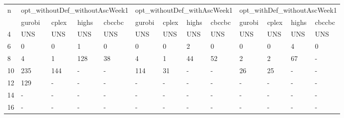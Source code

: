 \documentclass{article}
\begin{document}
\begin{table}[H]
\centering
\begin{tabular}{| p{0.35cm}|p{0.8cm}|p{0.8cm}|p{0.8cm}|p{0.7cm}|p{0.8cm}|p{0.8cm}|p{0.8cm}|p{0.7cm}|p{0.8cm}|p{0.8cm}|p{0.8cm}|p{0.7cm} | }
 \hline
 \multirow{2}{*}{n} & \multicolumn{4}{|c|}{opt\_withoutDef\_withoutAscWeek1}& \multicolumn{4}{|c|}{opt\_withoutDef\_withAscWeek1}& \multicolumn{4}{|c|}{opt\_withDef\_withoutAscWeek1}\\
 \cline{2-13}
  &  gurobi& cplex & highs & cbccbc& gurobi& cplex & highs & cbccbc& gurobi& cplex & highs & cbccbc\\
 \hline
 4&  UNS& UNS& UNS&   UNS&  UNS& UNS& UNS&  UNS&  UNS& UNS& UNS&   UNS\\
 6&   0& 0&  1&  0&  0& 0& 2&  0&  0& 0& 4&       0\\
 8&   4&  1& 128&   38&  4& 1& 44& 52&  2& 2& 67&      -\\
 10&  235& 144&  -&   -&  114& 31& -& -&  26& 25& -&   -\\
 12&  129&  -&  -& -&  -& -& -&  -&  -& -& -&     -\\
 14&  -&  -& -&  -&  -& -& -&  -&  -& -& -&   -\\
 16& - & - & - & - & - & -& -& - & - &- &- &-\\

\hline
\end{tabular}
\end{table}
\end{document}
